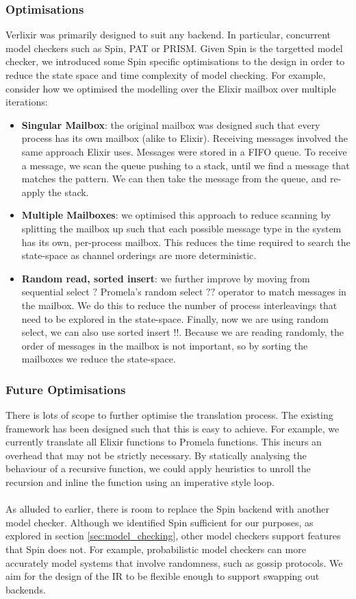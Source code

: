 \subsubsection{Optimisations}
Verlixir was primarily designed to suit any backend. In particular, concurrent model checkers such as Spin, PAT or PRISM. Given Spin is the targetted model checker, we introduced some Spin specific optimisations to the design in order to reduce the state space and time complexity of model checking. For example, consider how we optimised the modelling over the Elixir mailbox over multiple iterations:
\begin{itemize}
    \item \textbf{Singular Mailbox}: the original mailbox was designed such that every process has its own mailbox (alike to Elixir). Receiving messages involved the same approach Elixir uses. Messages were stored in a FIFO queue. To receive a message, we scan the queue pushing to a stack, until we find a message that matches the pattern. We can then take the message from the queue, and re-apply the stack. 
    \item \textbf{Multiple Mailboxes}: we optimised this approach to reduce scanning by splitting the mailbox up such that each possible message type in the system has its own, per-process mailbox. This reduces the time required to search the state-space as channel orderings are more deterministic. 
    \item \textbf{Random read, sorted insert}: we further improve by moving from sequential select $?$ Promela's random select $??$ operator to match messages in the mailbox. We do this to reduce the number of process interleavings that need to be explored in the state-space. Finally, now we are using random select, we can also use sorted insert $!!$. Because we are reading randomly, the order of messages in the mailbox is not important, so by sorting the mailboxes we reduce the state-space. 
\end{itemize}

\subsubsection{Future Optimisations}
There is lots of scope to further optimise the translation process. The existing framework has been designed such that this is easy to achieve. For example, we currently translate all Elixir functions to Promela functions. This incurs an overhead that may not be strictly necessary. By statically analysing the behaviour of a recursive function, we could apply heuristics to unroll the recursion and inline the function using an imperative style loop.
\\ \\
As alluded to earlier, there is room to replace the Spin backend with another model checker. Although we identified Spin sufficient for our purposes, as explored in section \ref{sec:model_checking}, other model checkers support features that Spin does not. For example, probabilistic model checkers can more accurately model systems that involve randomness, such as gossip protocols. We aim for the design of the IR to be flexible enough to support swapping out backends. 
